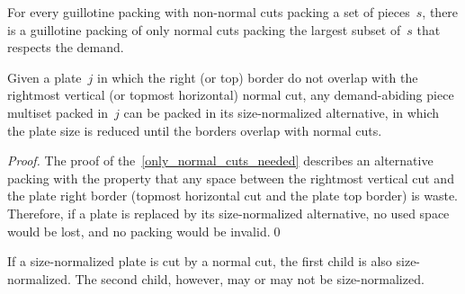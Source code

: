\documentclass[smallextended]{svjour3}       %
\begin{document}
\begin{theorem}\label{only_normal_cuts_needed}
For every guillotine packing with non-normal cuts packing a set of pieces~\(s\), there is a guillotine packing of only normal cuts packing the largest subset of~\(s\) that respects the demand.
\end{theorem}


\begin{corollary}\label{co:size_normalized_plate}
Given a plate~\(j\) in which the right (or top) border do not overlap with the rightmost vertical (or topmost horizontal) normal cut, any demand-abiding piece multiset packed in~\(j\) can be packed in its size-normalized alternative, in which the plate size is reduced until the borders overlap with normal cuts.
\end{corollary}

\begin{proof}
The proof of the~\autoref{only_normal_cuts_needed} describes an alternative packing with the property that any space between the rightmost vertical cut and the plate right border (topmost horizontal cut and the plate top border) is waste. Therefore, if a plate is replaced by its size-normalized alternative, no used space would be lost, and no packing would be invalid.\qed
\end{proof}

\begin{remark}
If a size-normalized plate is cut by a normal cut, the first child is also size-normalized. The second child, however, may or may not be size-normalized.
\end{remark}


\end{document}
